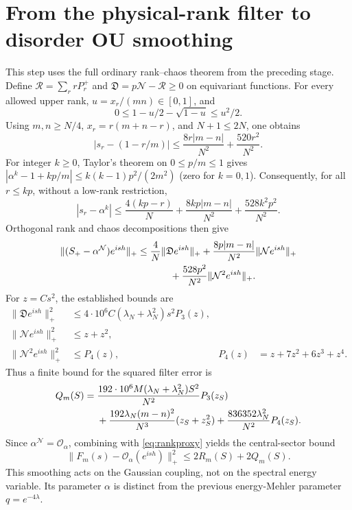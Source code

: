\documentclass[11pt,a4paper]{article}
\newcommand{\NN}{\mathcal N}
\newcommand{\DD}{\mathfrak D}
\begin{document}
\newpage
\section{From the physical-rank filter to disorder OU smoothing}
This step uses the full ordinary rank--chaos theorem from the
preceding stage. Define $\mathcal R=\sum_r rP_r^+$ and
$\DD=p\NN-\mathcal R\ge0$ on equivariant functions.
For every allowed upper rank, $u=x_r/(mn)\in[0,1]$, and
\begin{equation}
 0\le1-u/2-\sqrt{1-u}\le u^2/2.
\end{equation}
Using $m,n\ge N/4$, $x_r=r(m+n-r)$, and $N+1\le2N$, one obtains
\begin{equation}
 |s_r-(1-r/m)|\le
 \frac{8r|m-n|}{N^2}+\frac{520r^2}{N^2}.
\end{equation}
For integer $k\ge0$, Taylor's theorem on $0\le p/m\le1$ gives
$|\alpha^k-1+kp/m|\le k(k-1)p^2/(2m^2)$ (zero for $k=0,1$).
Consequently, for all $r\le kp$, without a low-rank restriction,
\begin{equation}
 \boxed{\quad
 |s_r-\alpha^k|\le\frac{4(kp-r)}N
 +\frac{8kp|m-n|}{N^2}+\frac{528k^2p^2}{N^2}.\quad}
 \label{eq:filterbound}
\end{equation}
Orthogonal rank and chaos decompositions then give
\begin{align}
 \|(S_+-\alpha^{\NN})e^{ish}\|_+
 &\le\frac4N\|\DD e^{ish}\|_+
 +\frac{8p|m-n|}{N^2}\|\NN e^{ish}\|_+\notag\\
 &\hspace{12mm}+\frac{528p^2}{N^2}\|\NN^2e^{ish}\|_+.
\end{align}
For $z=Cs^2$, the established bounds are
\begin{align}
 \|\DD e^{ish}\|_+^2&\le4\cdot10^6 C(\lambda_N+\lambda_N^2)s^2P_3(z),\\
 \|\NN e^{ish}\|_+^2&\le z+z^2,\\
 \|\NN^2e^{ish}\|_+^2&\le P_4(z),&
 P_4(z)&=z+7z^2+6z^3+z^4.
\end{align}
Thus a finite bound for the squared filter error is
\begin{align}
 Q_m(S)={}&\frac{192\cdot10^6 M(\lambda_N+\lambda_N^2)S^2}{N^2}P_3(z_S)\notag\\
 &+\frac{192\lambda_N(m-n)^2}{N^3}(z_S+z_S^2)
 +\frac{836352\lambda_N^2}{N^2}P_4(z_S).
\end{align}
Since $\alpha^{\NN}=\mathcal O_\alpha$, combining with
\eqref{eq:rankproxy} yields the central-sector bound
\begin{equation}
 \|F_m(s)-\mathcal O_\alpha(e^{ish})\|_+^2
 \le2R_m(S)+2Q_m(S).
 \label{eq:finite}
\end{equation}
This smoothing acts on the Gaussian coupling, not on the spectral
energy variable. Its parameter $\alpha$ is distinct from the
previous energy-Mehler parameter $q=e^{-4\lambda}$.
\end{document}
